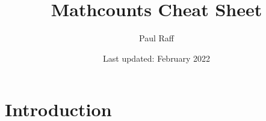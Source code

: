 \documentclass{article}
\title{Mathcounts Cheat Sheet}
\author{Paul Raff}
\date{Last updated: February 2022}
\begin{document}
\maketitle

\section{Introduction}
\end{document}

